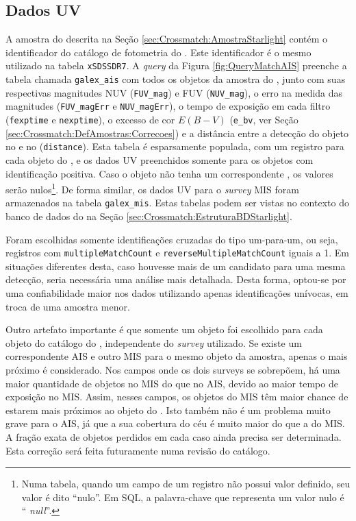 \subsection{Dados UV}

A amostra do \starlight descrita na Seção \ref{sec:Crossmatch:AmostraStarlight}
contém o identificador do catálogo de fotometria do \SDSS. Este identificador é
o mesmo utilizado na tabela \texttt{xSDSSDR7}. A {\em query} da Figura
\ref{fig:QueryMatchAIS} preenche a tabela chamada \texttt{galex\_ais} com todos
os objetos da amostra do \starlight, junto com suas respectivas magnitudes NUV
(\texttt{FUV\_mag}) e FUV (\texttt{NUV\_mag}), o erro na medida das magnitudes
({\tt FUV\_magErr} e \texttt{NUV\_magErr}), o tempo de exposição em cada filtro
({\tt fexptime} e \texttt{nexptime}), o excesso de cor $E(B-V)$ (\texttt{e\_bv},
ver Seção \ref{sec:Crossmatch:DefAmostras:Correcoes}) e a distância entre a
detecção do objeto no \galex e no \SDSS (\texttt{distance}). Esta tabela é
esparsamente populada, com um registro para cada objeto do \starlight, e os
dados UV preenchidos somente para os objetos com identificação positiva. Caso o
objeto não tenha um correspondente \galex, os valores serão nulos\footnote{Numa
tabela, quando um campo de um registro não possui valor definido, seu valor é
dito ``nulo''. Em SQL, a palavra-chave que representa um valor nulo é ``{\em
null}''.}. De forma similar, os dados UV para o {\em survey} MIS foram
armazenados na tabela \texttt{galex\_mis}. Estas tabelas podem ser vistas no
contexto do banco de dados do \starlight na Seção
\ref{sec:Crossmatch:EstruturaBDStarlight}.

Foram escolhidas somente identificações cruzadas do tipo um-para-um, ou seja,
registros com \texttt{multipleMatchCount} e \texttt{reverseMultipleMatchCount}
iguais a 1. Em situações diferentes desta, caso houvesse mais de um candidato
para uma mesma detecção, seria necessária uma análise mais detalhada. Desta
forma, optou-se por uma confiabilidade maior nos dados utilizando apenas
identificações unívocas, em troca de uma amostra menor.

Outro artefato importante é que somente um objeto \galex foi escolhido para cada
objeto do catálogo do \starlight, independente do {\em survey} utilizado. Se
existe um correspondente AIS e outro MIS para o mesmo objeto da amostra, apenas
o mais próximo é considerado. Nos campos onde os dois {surveys} se sobrepõem, há
uma maior quantidade de objetos no MIS do que no AIS, devido ao maior tempo de
exposição no MIS. Assim, nesses campos, os objetos do MIS têm maior chance de
estarem mais próximos ao objeto do \SDSS. Isto também não é um problema muito
grave para o AIS, já que a sua cobertura do céu é muito maior do que a do MIS. A
fração exata de objetos perdidos em cada caso ainda precisa ser determinada.
Esta correção será feita futuramente numa revisão do catálogo.

